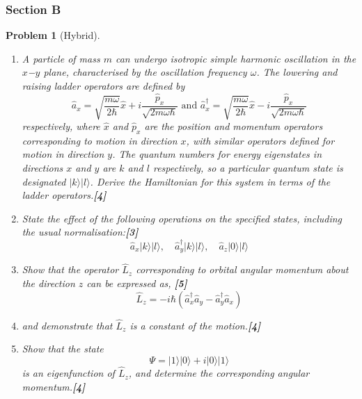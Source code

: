 \documentclass[a4paper]{article}
\theoremstyle{new}
\newtheorem{qns}{Problem}[subsection]
\begin{document}
\subsubsection{Section B}
\begin{qns}[Hybrid]\leavevmode
\begin{enumerate}[label=(\roman*)]
\item A particle of mass $m$ can undergo isotropic simple harmonic oscillation in the $x$−$y$ plane, characterised by the oscillation frequency $\omega$. The lowering and raising ladder operators are defined by
$$\hat{a}_x=\sqrt{\frac{m\omega}{2\hbar}}\hat{x}+i\frac{\hat{p}_x}{\sqrt{2m\omega\hbar}}\text{  and   }\hat{a}_x^\dag=\sqrt{\frac{m\omega}{2\hbar}}\hat{x}-i\frac{\hat{p}_x}{\sqrt{2m\omega\hbar}}$$
respectively, where $\hat{x}$ and $\hat{p}_x$ are the position and momentum operators corresponding to motion in direction $x$, with similar operators defined for motion in direction $y$. The quantum numbers for energy eigenstates in directions $x$ and $y$ are $k$ and $l$ respectively, so a particular quantum state is designated $|k\rangle |l\rangle$. Derive the Hamiltonian for this system in terms of the ladder operators.\hfill\textbf{[4]}
\item State the effect of the following operations on the specified states, including the usual normalisation:\hfill\textbf{[3]}
$$\hat{a}_x|k\rangle|l\rangle,\quad\hat{a}_y^\dag|k\rangle|l\rangle,\quad\hat{a}_z|0\rangle|l\rangle$$
\item Show that the operator $\hat{L}_z$ corresponding to orbital angular momentum about the direction $z$ can be expressed as, \hfill\textbf{[5]}
$$\hat{L}_z=-i\hbar(\hat{a}_x^\dag\hat{a}_y-\hat{a}_y^\dag\hat{a}_x)$$
\item and demonstrate that $\hat{L}_z$ is a constant of the motion.\hfill\textbf{[4]}
\item Show that the state
$$\Psi=|1\rangle|0\rangle+i|0\rangle|1\rangle$$
is an eigenfunction of $\hat{L}_z$, and determine the corresponding angular momentum.\hfill\textbf{[4]}
\end{enumerate}
\end{qns}
\end{document}
